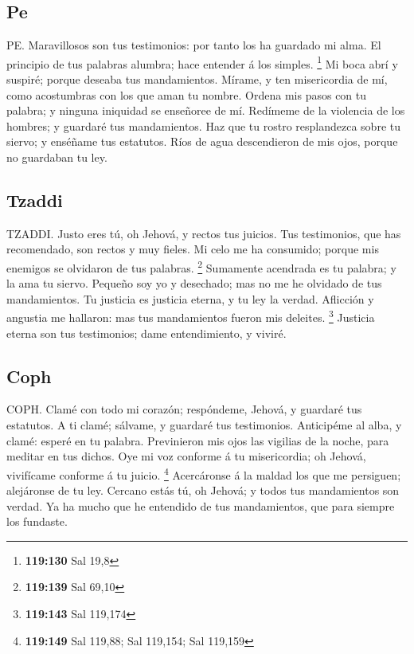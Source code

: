\hypertarget{pe}{%
\subsection{Pe}\label{pe}}

 PE. Maravillosos son tus testimonios: por tanto los ha
guardado mi alma.  El principio de tus palabras alumbra;
hace entender á los simples. \footnote{\textbf{119:130} Sal 19,8}
 Mi boca abrí y suspiré; porque deseaba tus mandamientos.
 Mírame, y ten misericordia de mí, como acostumbras con
los que aman tu nombre.  Ordena mis pasos con tu palabra;
y ninguna iniquidad se enseñoree de mí.  Redímeme de la
violencia de los hombres; y guardaré tus mandamientos. 
Haz que tu rostro resplandezca sobre tu siervo; y enséñame tus
estatutos.  Ríos de agua descendieron de mis ojos, porque
no guardaban tu ley.

\hypertarget{tzaddi}{%
\subsection{Tzaddi}\label{tzaddi}}

 TZADDI. Justo eres tú, oh Jehová, y rectos tus juicios.
 Tus testimonios, que has recomendado, son rectos y muy
fieles.  Mi celo me ha consumido; porque mis enemigos se
olvidaron de tus palabras. \footnote{\textbf{119:139} Sal 69,10}
 Sumamente acendrada es tu palabra; y la ama tu siervo.
 Pequeño soy yo y desechado; mas no me he olvidado de tus
mandamientos.  Tu justicia es justicia eterna, y tu ley la
verdad.  Aflicción y angustia me hallaron: mas tus
mandamientos fueron mis deleites. \footnote{\textbf{119:143} Sal 119,174}
 Justicia eterna son tus testimonios; dame entendimiento,
y viviré.

\hypertarget{coph}{%
\subsection{Coph}\label{coph}}

 COPH. Clamé con todo mi corazón; respóndeme, Jehová, y
guardaré tus estatutos.  A ti clamé; sálvame, y guardaré
tus testimonios.  Anticipéme al alba, y clamé: esperé en
tu palabra.  Previnieron mis ojos las vigilias de la
noche, para meditar en tus dichos.  Oye mi voz conforme á
tu misericordia; oh Jehová, vivifícame conforme á tu juicio. \footnote{\textbf{119:149}
  Sal 119,88; Sal 119,154; Sal 119,159}  Acercáronse á la
maldad los que me persiguen; alejáronse de tu ley. 
Cercano estás tú, oh Jehová; y todos tus mandamientos son verdad.
 Ya ha mucho que he entendido de tus mandamientos, que
para siempre los fundaste.

